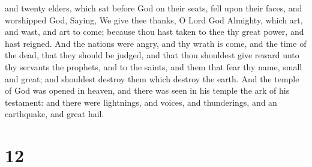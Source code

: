 and twenty elders, which sat before God on their seats, fell upon their
faces, and worshipped God,  Saying, We give thee thanks, O
Lord God Almighty, which art, and wast, and art to come; because thou
hast taken to thee thy great power, and hast reigned.  And
the nations were angry, and thy wrath is come, and the time of the dead,
that they should be judged, and that thou shouldest give reward unto thy
servants the prophets, and to the saints, and them that fear thy name,
small and great; and shouldest destroy them which destroy the earth.
 And the temple of God was opened in heaven, and there was
seen in his temple the ark of his testament: and there were lightnings,
and voices, and thunderings, and an earthquake, and great hail.

\hypertarget{section-11}{%
\section{12}\label{section-11}}


